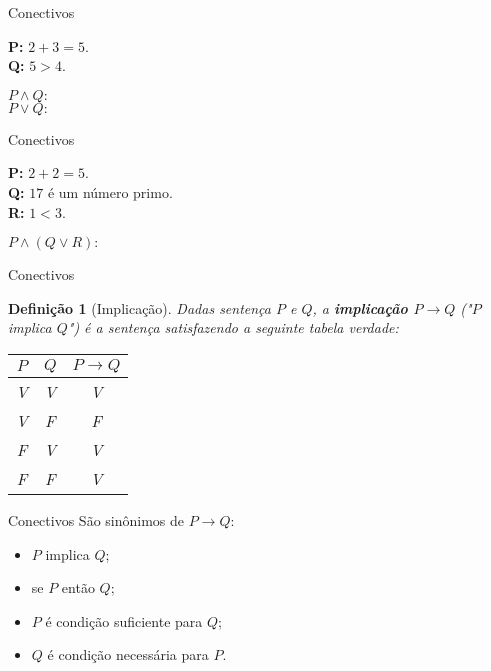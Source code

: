 \documentclass[10pt]{beamer}
\renewcommand{\indent}{\hspace*{2em}}
\theoremstyle{plain}
\newtheorem{defn}{Definição}[section]
\begin{document}
\begin{frame}{Conectivos}
            \begin{block}{}
     \textbf{P:} $2+3=5$. \\
     \textbf{Q:} $5>4$.
    \end{block}
    $$$$
    $P\wedge Q:$
    $$$$
    $$$$
    $P\vee Q:$
\end{frame}

\begin{frame}{Conectivos}
    \begin{block}{}
     \textbf{P:} $2+2=5$. \\
     \textbf{Q:} $17$ é um número primo. \\
     \textbf{R:} $1<3$.
    \end{block}  
    $$$$
    $P\wedge(Q\vee R):$
\end{frame}

\begin{frame}{Conectivos}
        \begin{defn}[Implicação]
        \vfill\indent Dadas sentença $P$ e $Q$, a \textbf{implicação $P\rightarrow Q$} ("$P$ implica $Q$") é a sentença satisfazendo a seguinte tabela verdade:
        \begin{center}
            \begin{tabular}{|c|c|c|}
    \hline
    $P$ & $Q$  & $P\rightarrow Q$\\
    \hline
    V & V & V \\
    \hline
    V & F & F \\
    \hline
    F & V & V \\
    \hline
    F & F & V \\
    \hline
\end{tabular}
        \end{center}
    \end{defn}
\end{frame}

\begin{frame}{Conectivos}
    \indent São sinônimos de $P\rightarrow Q$:
    \begin{itemize}
        \item $P$ implica $Q$;
        \item se $P$ então $Q$;
        \item $P$ é condição suficiente para $Q$;
        \item $Q$ é condição necessária para $P$.
    \end{itemize}
\end{frame}
\end{document}
